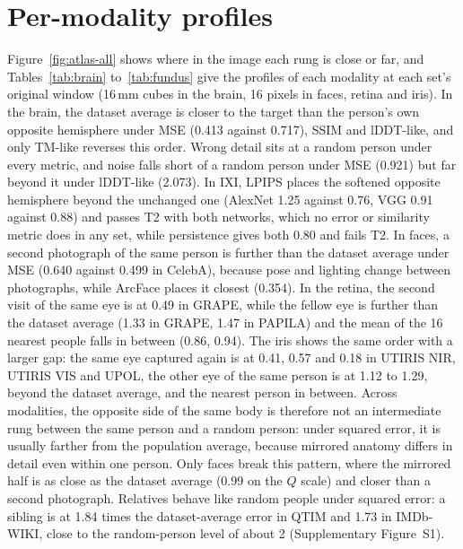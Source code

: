 \section{Per-modality profiles}
\label{sec:s-profiles}
Figure~\ref{fig:atlas-all} shows where in the image each rung is close or far, and Tables~\ref{tab:brain} to~\ref{tab:fundus} give the profiles of each modality at each set's original window (16\,mm cubes in the brain, 16 pixels in faces, retina and iris).
In the brain, the dataset average is closer to the target than the person's own opposite hemisphere under \ac{MSE} (0.413 against 0.717), \ac{SSIM} and \ac{lDDT}-like, and only \ac{TM}-like reverses this order\statuspre.
Wrong detail sits at a random person under every metric, and noise falls short of a random person under \ac{MSE} (0.921) but far beyond it under \ac{lDDT}-like (2.073)\statuspre.
In IXI, \acs{LPIPS} places the softened opposite hemisphere beyond the unchanged one (AlexNet 1.25 against 0.76, VGG 0.91 against 0.88) and passes T2 with both networks, which no error or similarity metric does in any set, while persistence gives both 0.80 and fails T2\statuspre.
In faces, a second photograph of the same person is further than the dataset average under \ac{MSE} (0.640 against 0.499 in CelebA), because pose and lighting change between photographs, while ArcFace places it closest (0.354)\statusfinal.
In the retina, the second visit of the same eye is at 0.49 in GRAPE, while the fellow eye is further than the dataset average (1.33 in GRAPE, 1.47 in PAPILA) and the mean of the 16 nearest people falls in between (0.86, 0.94)\statuspre.
The iris shows the same order with a larger gap: the same eye captured again is at 0.41, 0.57 and 0.18 in UTIRIS \ac{NIR}, UTIRIS \ac{VIS} and UPOL, the other eye of the same person is at 1.12 to 1.29, beyond the dataset average, and the nearest person in between\statuspre.
Across modalities, the opposite side of the same body is therefore not an intermediate rung between the same person and a random person: under squared error, it is usually farther from the population average, because mirrored anatomy differs in detail even within one person.
Only faces break this pattern, where the mirrored half is as close as the dataset average (0.99 on the $Q$ scale) and closer than a second photograph.
Relatives behave like random people under squared error: a sibling is at 1.84 times the dataset-average error in QTIM and 1.73 in IMDb-WIKI, close to the random-person level of about 2 (Supplementary Figure~S1)\statuspre.

